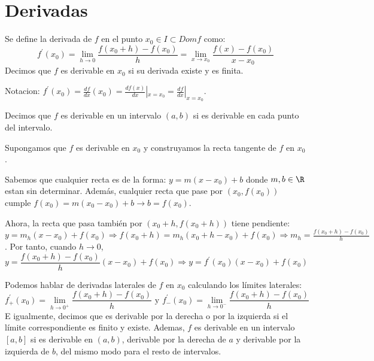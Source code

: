 \part{Derivadas}
\begin{definition}[Derivada]
	Se define la derivada de \(f \) en el punto \(x_0 \in I \subset Domf \) como:
	\[
		f^\prime (x_0) = \lim\limits_{h  \to 0 } \frac{f(x_0 + h ) - f(x_0)}{h} = \lim\limits_{x  \to x_0 } \frac{f(x) - f(x_0)}{x - x_0}
	\]
	Decimos que \(f \) es derivable en \(x_0 \) si su derivada existe y es finita.
\end{definition}
Notacion: \(f^\prime (x_0) = \frac{df}{dx} (x_0) = \frac{df(x)}{dx}|_{x = x_0} = \frac{df}{dx}|_{x = x_0}\).

\begin{definition}
	Decimos que \(f \) es derivable en un intervalo \((a,b )\) si es derivable en cada punto del intervalo.
\end{definition}

Supongamos que \(f \) es derivable en \(x_0 \) y construyamos la recta tangente de \(f \) en \(x_0 \).

Sabemos que cualquier recta es de la forma: \(y = m(x-x_0) + b \) donde \(m,b \in \R \) estan sin determinar. Además, cualquier recta que pase por \((x_0, f(x_0 ))\) cumple \(f(x_0) = m(x_0 - x_0) + b \rightarrow b = f(x_0 )\).

Ahora, la recta que pasa también por \((x_0 + h, f(x_0 + h ))\) tiene pendiente: \(y = m_h(x - x_0) + f(x_0 )\Rightarrow f(x_0 + h) = m_h (x_0 + h - x_0) + f(x_0) \Rightarrow m_h = \frac{f(x_0 + h) - f(x_0)}{h}\). Por tanto, cuando \(h \to 0\),
\[
	y = \frac{f(x_0 + h) - f(x_0)}{h} (x - x_0) + f(x_0) \Rightarrow \boxed{y = f^\prime (x_0) (x - x_0) + f(x_0)}
\]

\begin{definition}
	Podemos hablar de derivadas laterales de \(f \) en \(x_0 \) calculando los límites laterales:
	\[
		f^\prime_+(x_0) = \lim\limits_{h  \to 0^{+ } } \frac{f(x_0 + h) - f(x_0)}{h } \text{ y } f^\prime_-(x_0) = \lim\limits_{h  \to 0^{- } } \frac{f(x_0 + h) - f(x_0)}{h }
	\]
	E igualmente, decimos que es derivable por la derecha o por la izquierda si el límite correspondiente es finito y existe. Ademas, \(f \) es derivable en un intervalo \([a,b ]\) si es derivable en \((a,b )\), derivable por la derecha de \(a \) y derivable por la izquierda de \(b \), del mismo modo para el resto de intervalos.
\end{definition}

